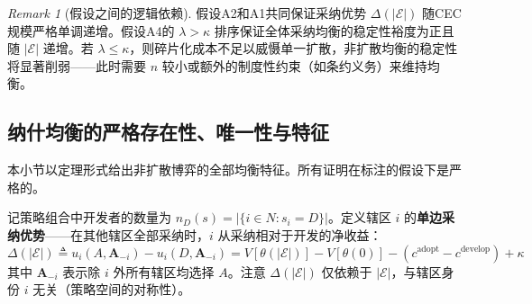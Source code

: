 \documentclass[12pt,a4paper]{ctexart}
\theoremstyle{definition}
\theoremstyle{remark}
\newtheorem{remark}{Remark}[section]
\begin{document}
\begin{remark}[假设之间的逻辑依赖]
假设A2和A1共同保证采纳优势 $\Delta(|\mathcal{E}|)$ 随CEC规模严格单调递增。假设A4的 $\lambda > \kappa$ 排序保证全体采纳均衡的稳定性裕度为正且随 $|\mathcal{E}|$ 递增。若 $\lambda \leq \kappa$，则碎片化成本不足以威慑单一扩散，非扩散均衡的稳定性将显著削弱——此时需要 $n$ 较小或额外的制度性约束（如条约义务）来维持均衡。
\end{remark}

\subsection{纳什均衡的严格存在性、唯一性与特征}

本小节以定理形式给出非扩散博弈的全部均衡特征。所有证明在标注的假设下是严格的。

记策略组合中开发者的数量为 $n_D(s) = |\{i \in N : s_i = D\}|$。定义辖区 $i$ 的\textbf{单边采纳优势}——在其他辖区全部采纳时，$i$ 从采纳相对于开发的净收益：
\begin{equation}
\Delta(|\mathcal{E}|) \triangleq u_i(A, \mathbf{A}_{-i}) - u_i(D, \mathbf{A}_{-i}) = V[\theta(|\mathcal{E}|)] - V[\theta(0)] - (c^{\text{adopt}} - c^{\text{develop}}) + \kappa
\label{eq:adoption-advantage-def}
\end{equation}
其中 $\mathbf{A}_{-i}$ 表示除 $i$ 外所有辖区均选择 $A$。注意 $\Delta(|\mathcal{E}|)$ 仅依赖于 $|\mathcal{E}|$，与辖区身份 $i$ 无关（策略空间的对称性）。
\end{document}
